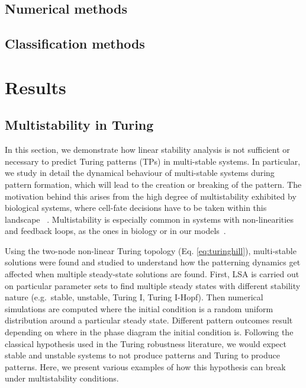 \documentclass[10pt,letterpaper]{article}
\begin{document}


\subsection*{Numerical methods}



\subsection*{Classification methods}



\section*{Results}
\subsection*{Multistability in Turing}

In this section, we demonstrate how linear stability analysis is not sufficient or necessary to predict Turing patterns (TPs) in multi-stable systems.
In particular, we study in detail the dynamical behaviour of multi-stable systems during pattern formation, which will lead to the creation or breaking of the pattern.
The motivation behind this arises from the high degree of multistability exhibited by biological systems, where cell-fate decisions have to be taken within this landscape ~\parencite{huang2000shape,moris2016transition}.
Multistability is especially common in systems with non-linearities and feedback loops, as the ones in biology or in our models~\parencite{pham2020complexity, leite2009multistability}.

Using the two-node non-linear Turing topology (Eq. \ref{eq:turinghill}), multi-stable solutions were found and studied to understand how the patterning dynamics get affected when multiple steady-state solutions are found.
First, LSA is carried out on particular parameter sets to find multiple steady states with different stability nature (e.g.~stable, unstable, Turing I, Turing I-Hopf).
Then numerical simulations are computed where the initial condition is a random uniform distribution around a particular steady state.
Different pattern outcomes result depending on where in the phase diagram the initial condition is.
Following the classical hypothesis used in the Turing robustness literature, we would expect stable and unstable systems to not produce patterns and Turing to produce patterns.
Here, we present various examples of how this hypothesis can break under multistability conditions.
\end{document}
